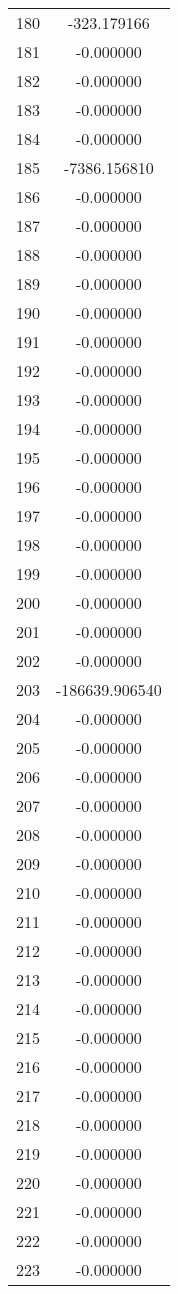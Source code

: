\documentclass[12pt]{article}
\begin{document}
\begin{longtable}{@{}cc@{}}
180 & -323.179166 \\
181 & -0.000000 \\
182 & -0.000000 \\
183 & -0.000000 \\
184 & -0.000000 \\
185 & -7386.156810 \\
186 & -0.000000 \\
187 & -0.000000 \\
188 & -0.000000 \\
189 & -0.000000 \\
190 & -0.000000 \\
191 & -0.000000 \\
192 & -0.000000 \\
193 & -0.000000 \\
194 & -0.000000 \\
195 & -0.000000 \\
196 & -0.000000 \\
197 & -0.000000 \\
198 & -0.000000 \\
199 & -0.000000 \\
200 & -0.000000 \\
201 & -0.000000 \\
202 & -0.000000 \\
203 & -186639.906540 \\
204 & -0.000000 \\
205 & -0.000000 \\
206 & -0.000000 \\
207 & -0.000000 \\
208 & -0.000000 \\
209 & -0.000000 \\
210 & -0.000000 \\
211 & -0.000000 \\
212 & -0.000000 \\
213 & -0.000000 \\
214 & -0.000000 \\
215 & -0.000000 \\
216 & -0.000000 \\
217 & -0.000000 \\
218 & -0.000000 \\
219 & -0.000000 \\
220 & -0.000000 \\
221 & -0.000000 \\
222 & -0.000000 \\
223 & -0.000000 \\

\end{longtable}
\end{document}
